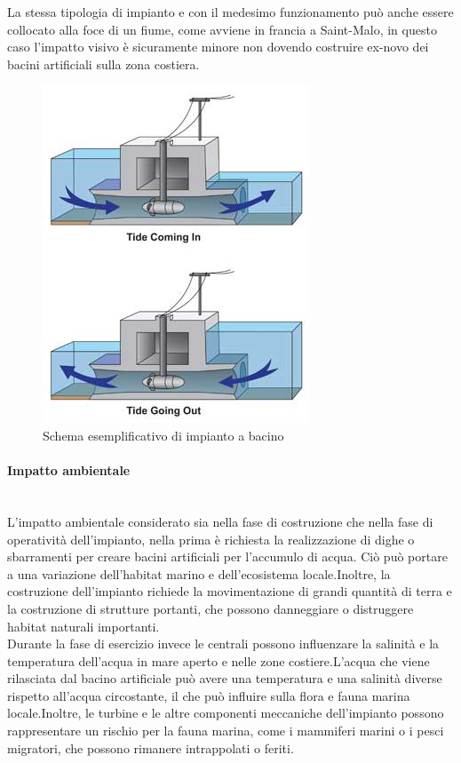 La stessa tipologia di impianto e con il medesimo funzionamento può anche essere collocato alla foce di un fiume, come avviene in francia a Saint-Malo, in questo caso l'impatto visivo è sicuramente minore non dovendo costruire ex-novo dei bacini artificiali sulla zona costiera.\\
\begin{figure}[H]
    \centering
    \includegraphics[height=0.35\textwidth]{res/cap 3/Tidal-power-300}
    \caption{Schema esemplificativo di impianto a bacino}
\end{figure}\noindent
\paragraph{Impatto ambientale}\mbox{}\\
L'impatto ambientale considerato sia nella fase di costruzione che nella fase di operatività dell'impianto, nella prima è richiesta la realizzazione di dighe o sbarramenti per creare bacini artificiali per l'accumulo di acqua.
Ciò può portare a una variazione dell'habitat marino e dell'ecosistema locale.Inoltre, la costruzione dell'impianto richiede la movimentazione di grandi quantità di terra e la costruzione di strutture portanti, che possono danneggiare o distruggere habitat naturali importanti.\\
Durante la fase di esercizio invece le centrali possono influenzare la salinità e la temperatura dell'acqua in mare aperto e nelle zone costiere.L'acqua che viene rilasciata dal bacino artificiale può avere una temperatura e una salinità diverse rispetto all'acqua circostante, il che può influire sulla flora e fauna marina locale.Inoltre, le turbine e le altre componenti meccaniche dell'impianto possono rappresentare un rischio per la fauna marina, come i mammiferi marini o i pesci migratori, che possono rimanere intrappolati o feriti.\\
